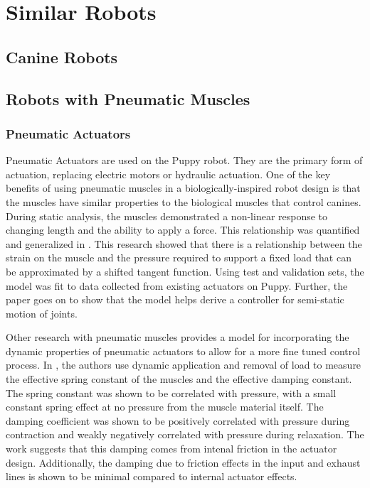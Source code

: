 \section{Similar Robots}

\subsection{Canine Robots}

\subsection{Robots with Pneumatic Muscles}


\subsubsection{Pneumatic Actuators}

Pneumatic Actuators are used on the Puppy robot. They are the primary form of actuation, replacing electric motors or hydraulic actuation. One of the key benefits of using pneumatic muscles in a biologically-inspired robot design is that the muscles have similar properties to the biological muscles that control canines. 
During static analysis, the muscles demonstrated a non-linear response to changing length and the ability to apply a force. This relationship was quantified and generalized in \cite{HuntPMuscles}. This research showed that there is a relationship between the strain on the muscle and the pressure required to support a fixed load that can be approximated by a shifted tangent function. Using test and validation sets, the model was fit to data collected from existing actuators on Puppy. Further, the paper goes on to show that the model helps derive a controller for semi-static motion of joints. \cite{HuntPMuscles}

Other research with pneumatic muscles provides a model for incorporating the dynamic properties of pneumatic actuators to allow for a more fine tuned control process. In \cite{DynamicPMuscles}, the authors use dynamic application and removal of load to measure the effective spring constant of the muscles and the effective damping constant. The spring constant was shown to be correlated with pressure, with a small constant spring effect at no pressure from the muscle material itself. The damping coefficient was shown to be positively correlated with pressure during contraction and weakly negatively correlated with pressure during relaxation. The work suggests that this damping comes from intenal friction in the actuator design. Additionally, the damping due to friction effects in the input and exhaust lines is shown to be minimal compared to internal actuator effects. \cite{DynamicPMuscles}

